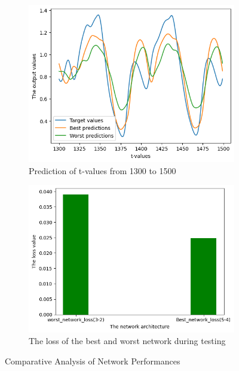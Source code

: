 \documentclass[a4paper]{article}
\begin{document}
\begin{figure}[htbp]
    \centering
    \begin{subfigure}[b]{0.45\textwidth}
        \centering
        \includegraphics[width=\textwidth]{Labs/Lab 1/Lab 1b/Part2/figure/best_worst_pred.png}
        \caption{Prediction of t-values from 1300 to 1500}
        \label{fig:Prediction_results_Mackey_glasskit}
    \end{subfigure}
    \hfill %
    \begin{subfigure}[b]{0.45\textwidth}
        \centering
        \includegraphics[width=\textwidth]{Labs/Lab 1/Lab 1b/Part2/figure/best_vs_worst_loss.png}
        \caption{The loss of the best and worst network during testing}
        \label{fig:best_loss_comparision}
    \end{subfigure}
    \caption{Comparative Analysis of Network Performances}
    \label{fig:combined_figure}
\end{figure}
\end{document}
